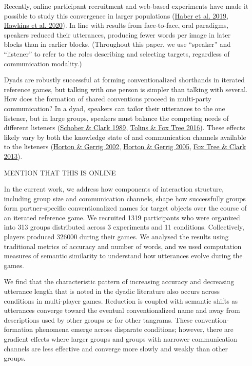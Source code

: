 \documentclass[
  english,
  a4paper,
]{article}
\begin{document}
Recently, online participant recruitment and web-based experiments have made it possible to study this convergence in larger populations (\protect\hyperlink{ref-haber2019}{Haber et al. 2019}, \protect\hyperlink{ref-hawkinsCharacterizingDynamicsLearning2020}{Hawkins et al. 2020}). In line with results from face-to-face, oral paradigms, speakers reduced their utterances, producing fewer words per image in later blocks than in earlier blocks. (Throughout this paper, we use ``speaker'' and ``listener'' to refer to the roles describing and selecting targets, regardless of communication modality.)

Dyads are robustly successful at forming conventionalized shorthands in iterated reference games, but talking with one person is simpler than talking with several. How does the formation of shared conventions proceed in multi-party communication? In a dyad, speakers can tailor their utterances to the one listener, but in large groups, speakers must balance the competing needs of different listeners (\protect\hyperlink{ref-schober1989}{Schober \& Clark 1989}, \protect\hyperlink{ref-tolins2016}{Tolins \& Fox Tree 2016}). These effects likely vary by both the knowledge state of and communication channels available to the listeners (\protect\hyperlink{ref-horton2002}{Horton \& Gerrig 2002}, \protect\hyperlink{ref-horton2005}{Horton \& Gerrig 2005}, \protect\hyperlink{ref-fox-tree2013}{Fox Tree \& Clark 2013}).

MENTION THAT THIS IS ONLINE

In the current work, we address how components of interaction structure, including group size and communication channels, shape how successfully groups form partner-specific conventionalized names for target objects over the course of an iterated reference game. We recruited 1319 participants who were organized into 313 groups distributed across 3 experiments and 11 conditions. Collectively, players produced 326000 during their games. We analysed the results using traditional metrics of accuracy and number of words, and we used computation measures of semantic similarity to understand how utterances evolve during the games.

We find that the characteristic pattern of increasing accuracy and decreasing utterance length that is noted in the dyadic literature also occurs across conditions in multi-player games. Reduction is coupled with semantic shifts as utterances converge toward the eventual conventionalized name and away from descriptions used by other groups or for other tangrams. These convention-formation phenomena emerge across disparate conditions; however, there are gradient effects where larger groups and groups with narrower communication channels are less effective and converge more slowly and weakly than other groups.
\end{document}
